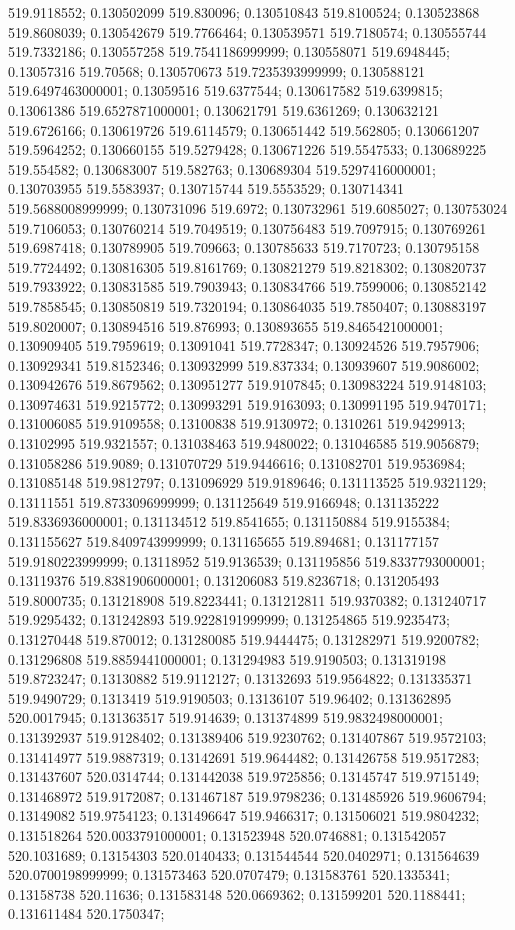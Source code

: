 519.9118552; 0.130502099 519.830096; 0.130510843 519.8100524; 0.130523868 519.8608039; 0.130542679 519.7766464; 0.130539571 519.7180574; 0.130555744 519.7332186; 0.130557258 519.7541186999999; 0.130558071 519.6948445; 0.13057316 519.70568; 0.130570673 519.7235393999999; 0.130588121 519.6497463000001; 0.13059516 519.6377544; 0.130617582 519.6399815; 0.13061386 519.6527871000001; 0.130621791 519.6361269; 0.130632121 519.6726166; 0.130619726 519.6114579; 0.130651442 519.562805; 0.130661207 519.5964252; 0.130660155 519.5279428; 0.130671226 519.5547533; 0.130689225 519.554582; 0.130683007 519.582763; 0.130689304 519.5297416000001; 0.130703955 519.5583937; 0.130715744 519.5553529; 0.130714341 519.5688008999999; 0.130731096 519.6972; 0.130732961 519.6085027; 0.130753024 519.7106053; 0.130760214 519.7049519; 0.130756483 519.7097915; 0.130769261 519.6987418; 0.130789905 519.709663; 0.130785633 519.7170723; 0.130795158 519.7724492; 0.130816305 519.8161769; 0.130821279 519.8218302; 0.130820737 519.7933922; 0.130831585 519.7903943; 0.130834766 519.7599006; 0.130852142 519.7858545; 0.130850819 519.7320194; 0.130864035 519.7850407; 0.130883197 519.8020007; 0.130894516 519.876993; 0.130893655 519.8465421000001; 0.130909405 519.7959619; 0.13091041 519.7728347; 0.130924526 519.7957906; 0.130929341 519.8152346; 0.130932999 519.837334; 0.130939607 519.9086002; 0.130942676 519.8679562; 0.130951277 519.9107845; 0.130983224 519.9148103; 0.130974631 519.9215772; 0.130993291 519.9163093; 0.130991195 519.9470171; 0.131006085 519.9109558; 0.13100838 519.9130972; 0.1310261 519.9429913; 0.13102995 519.9321557; 0.131038463 519.9480022; 0.131046585 519.9056879; 0.131058286 519.9089; 0.131070729 519.9446616; 0.131082701 519.9536984; 0.131085148 519.9812797; 0.131096929 519.9189646; 0.131113525 519.9321129; 0.13111551 519.8733096999999; 0.131125649 519.9166948; 0.131135222 519.8336936000001; 0.131134512 519.8541655; 0.131150884 519.9155384; 0.131155627 519.8409743999999; 0.131165655 519.894681; 0.131177157 519.9180223999999; 0.13118952 519.9136539; 0.131195856 519.8337793000001; 0.13119376 519.8381906000001; 0.131206083 519.8236718; 0.131205493 519.8000735; 0.131218908 519.8223441; 0.131212811 519.9370382; 0.131240717 519.9295432; 0.131242893 519.9228191999999; 0.131254865 519.9235473; 0.131270448 519.870012; 0.131280085 519.9444475; 0.131282971 519.9200782; 0.131296808 519.8859441000001; 0.131294983 519.9190503; 0.131319198 519.8723247; 0.13130882 519.9112127; 0.13132693 519.9564822; 0.131335371 519.9490729; 0.1313419 519.9190503; 0.13136107 519.96402; 0.131362895 520.0017945; 0.131363517 519.914639; 0.131374899 519.9832498000001; 0.131392937 519.9128402; 0.131389406 519.9230762; 0.131407867 519.9572103; 0.131414977 519.9887319; 0.13142691 519.9644482; 0.131426758 519.9517283; 0.131437607 520.0314744; 0.131442038 519.9725856; 0.13145747 519.9715149; 0.131468972 519.9172087; 0.131467187 519.9798236; 0.131485926 519.9606794; 0.13149082 519.9754123; 0.131496647 519.9466317; 0.131506021 519.9804232; 0.131518264 520.0033791000001; 0.131523948 520.0746881; 0.131542057 520.1031689; 0.13154303 520.0140433; 0.131544544 520.0402971; 0.131564639 520.0700198999999; 0.131573463 520.0707479; 0.131583761 520.1335341; 0.13158738 520.11636; 0.131583148 520.0669362; 0.131599201 520.1188441; 0.131611484 520.1750347; 
